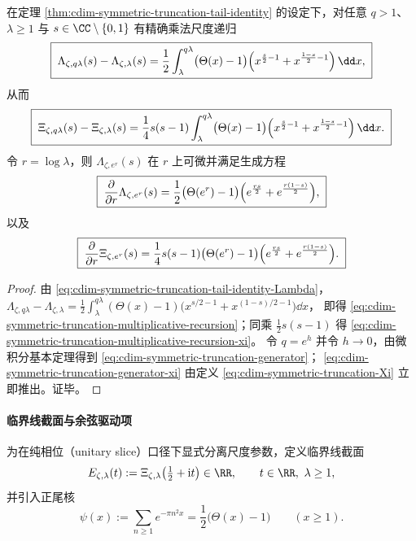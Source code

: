 \begin{corollary}[乘法尺度递归律与生成算子]\label{cor:cdim-symmetric-truncation-multiplicative-recursion-generator}
在定理 \ref{thm:cdim-symmetric-truncation-tail-identity} 的设定下，对任意 \(q>1\)、\(\lambda\ge 1\) 与 \(s\in\CC\setminus\{0,1\}\) 有精确乘法尺度递归
\begin{equation}\label{eq:cdim-symmetric-truncation-multiplicative-recursion}
\boxed{\;
\Lambda_{\zeta,q\lambda}(s)-\Lambda_{\zeta,\lambda}(s)
=\frac12\int_{\lambda}^{q\lambda}\bigl(\Theta(x)-1\bigr)
\Bigl(x^{\frac{s}{2}-1}+x^{\frac{1-s}{2}-1}\Bigr)\,\dd x,\;}
\end{equation}
从而
\begin{equation}\label{eq:cdim-symmetric-truncation-multiplicative-recursion-xi}
\boxed{\;
\Xi_{\zeta,q\lambda}(s)-\Xi_{\zeta,\lambda}(s)
=\frac14 s(s-1)\int_{\lambda}^{q\lambda}\bigl(\Theta(x)-1\bigr)
\Bigl(x^{\frac{s}{2}-1}+x^{\frac{1-s}{2}-1}\Bigr)\,\dd x.\;}
\end{equation}
令 \(r=\log\lambda\)，则 \(\Lambda_{\zeta,e^r}(s)\) 在 \(r\) 上可微并满足生成方程
\begin{equation}\label{eq:cdim-symmetric-truncation-generator}
\boxed{\;
\frac{\partial}{\partial r}\Lambda_{\zeta,e^r}(s)
=\frac12\bigl(\Theta(e^r)-1\bigr)\Bigl(e^{\frac{rs}{2}}+e^{\frac{r(1-s)}{2}}\Bigr),\;}
\end{equation}
以及
\begin{equation}\label{eq:cdim-symmetric-truncation-generator-xi}
\boxed{\;
\frac{\partial}{\partial r}\Xi_{\zeta,e^r}(s)
=\frac14 s(s-1)\bigl(\Theta(e^r)-1\bigr)\Bigl(e^{\frac{rs}{2}}+e^{\frac{r(1-s)}{2}}\Bigr).\;}
\end{equation}
\end{corollary}
\begin{proof}
由 \eqref{eq:cdim-symmetric-truncation-tail-identity-Lambda}，
\(
\Lambda_{\zeta,q\lambda}-\Lambda_{\zeta,\lambda}
=\frac12\int_{\lambda}^{q\lambda}(\Theta(x)-1)\bigl(x^{s/2-1}+x^{(1-s)/2-1}\bigr)\dd x
\)，
即得 \eqref{eq:cdim-symmetric-truncation-multiplicative-recursion}；同乘 \(\tfrac12 s(s-1)\) 得 \eqref{eq:cdim-symmetric-truncation-multiplicative-recursion-xi}。
令 \(q=e^h\) 并令 \(h\to 0\)，由微积分基本定理得到 \eqref{eq:cdim-symmetric-truncation-generator}；
\eqref{eq:cdim-symmetric-truncation-generator-xi} 由定义 \eqref{eq:cdim-symmetric-truncation-Xi} 立即推出。证毕。
\end{proof}

\paragraph{临界线截面与余弦驱动项}
为在纯相位（unitary slice）口径下显式分离尺度参数，定义临界线截面
\[
E_{\zeta,\lambda}(t):=\Xi_{\zeta,\lambda}\!\left(\tfrac12+\mathrm{i}t\right)\in\RR,
\qquad t\in\RR,\ \lambda\ge 1,
\]
并引入正尾核
\[
\psi(x):=\sum_{n\ge 1}e^{-\pi n^2 x}=\frac12\bigl(\Theta(x)-1\bigr)\qquad(x\ge 1).
\]

